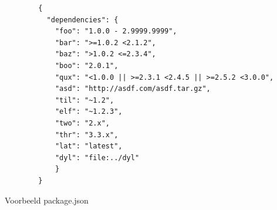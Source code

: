 \begin{listing}[H]
    \centering
    \begin{verbatim}
        {
          "dependencies": {
            "foo": "1.0.0 - 2.9999.9999",
            "bar": ">=1.0.2 <2.1.2",
            "baz": ">1.0.2 <=2.3.4",
            "boo": "2.0.1",
            "qux": "<1.0.0 || >=2.3.1 <2.4.5 || >=2.5.2 <3.0.0",
            "asd": "http://asdf.com/asdf.tar.gz",
            "til": "~1.2",
            "elf": "~1.2.3",
            "two": "2.x",
            "thr": "3.3.x",
            "lat": "latest",
            "dyl": "file:../dyl"
            }
        }
        \end{verbatim}
        \caption{Voorbeeld package.json \autocite{Kaplan2024}}
\end{listing}

